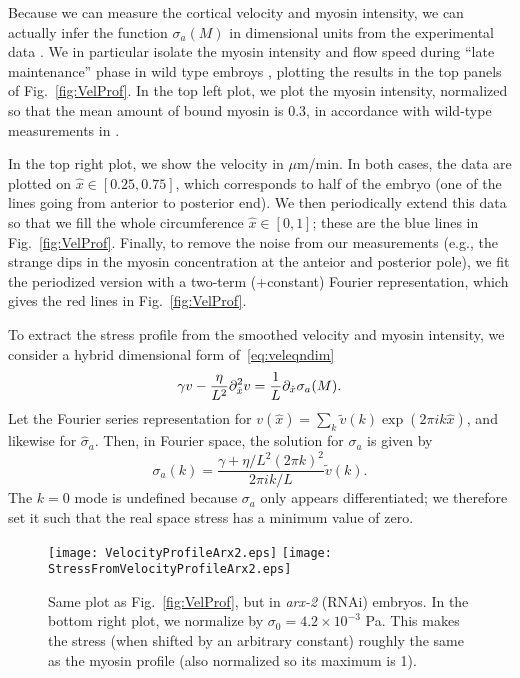 \documentclass[11pt]{article}
\newcommand{\6}[1]{#1_{\text{6}}}
\newcommand{\3}[1]{#1_{\text{3}}}
\begin{document}
Because we can measure the cortical velocity and myosin intensity, we can actually infer the function $\sigma_a(M)$ in dimensional units from the experimental data \cite{sailer2015dynamic}. We in particular isolate the myosin intensity and flow speed during ``late maintenance'' phase in wild type embroys \cite[Fig.~1B(bottom)]{sailer2015dynamic}, plotting the results in the top panels of Fig.\ \ref{fig:VelProf}. In the top left plot, we plot the myosin intensity, normalized so that the mean amount of bound myosin is 0.3, in accordance with wild-type measurements in \cite[Fig.~S3]{gross2019guiding}. 

In the top right plot, we show the velocity in $\mu$m/min. In both cases, the data are plotted on $\hat x \in [0.25,0.75]$, which corresponds to half of the embryo (one of the lines going from anterior to posterior end). We then periodically extend this data so that we fill the whole circumference $\hat x \in [0,1]$; these are the blue lines in Fig.\ \ref{fig:VelProf}. Finally, to remove the noise from our measurements (e.g., the strange dips in the myosin concentration at the anteior and posterior pole), we fit the periodized version with a two-term (+constant) Fourier representation, which gives the red lines in Fig.\ \ref{fig:VelProf}. 

To extract the stress profile from the smoothed velocity and myosin intensity, we consider a hybrid dimensional form of\ \eqref{eq:veleqndim}
\begin{equation*}
\gamma v -\frac{ \eta}{L^2} \partial_{\hat{x}}^2 v = \frac{1}{L} \partial_{\hat{x}}  \sigma_a(M). 
\end{equation*}
Let the Fourier series representation for $v(\hat x)= \sum_k \tilde v(k) \exp{\left(2 \pi i k \hat x \right)}$, and likewise for $\hat \sigma_a$. Then, in Fourier space, the solution for $\sigma_a$ is given by 
\begin{equation}
\label{eq:SigmaAF}
\sigma_a(k) = \frac{\gamma+ \eta/L^2 \left(2 \pi k\right)^2}{2 \pi i k/L} \tilde v(k). 
\end{equation}
The $k=0$ mode is undefined because $\sigma_a$ only appears differentiated; we therefore set it such that the real space stress has a minimum value of zero. 

\begin{figure}
\centering
\texttt{[image: VelocityProfileArx2.eps]}
\texttt{[image: StressFromVelocityProfileArx2.eps]}
\caption{\label{fig:VelProfArx2} Same plot as Fig.\ \ref{fig:VelProf}, but in \emph{arx-2} (RNAi) embryos. In the bottom right plot, we normalize by $\sigma_0=4.2 \times 10^{-3}$ Pa. This makes the stress (when shifted by an arbitrary constant) roughly the same as the myosin profile (also normalized so its maximum is 1).}
\end{figure}
\end{document}
